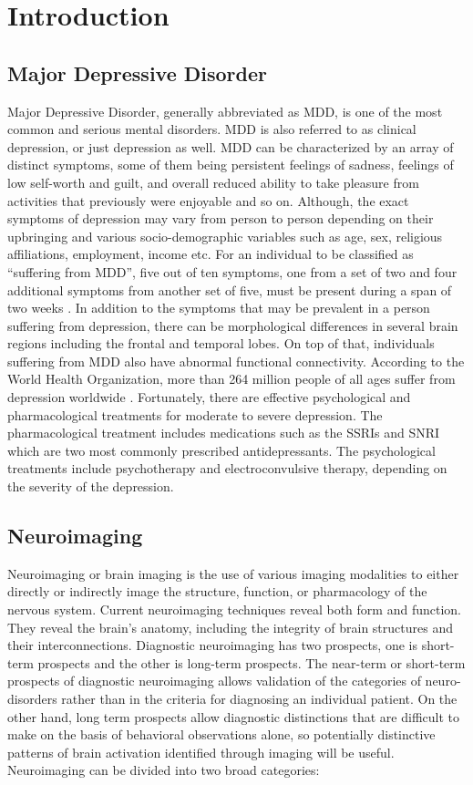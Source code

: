 \documentclass[12pt]{article}
\begin{document}
\section{Introduction}

\subsection{Major Depressive Disorder}

Major Depressive Disorder, generally abbreviated as MDD, is one of the
most common and serious mental disorders. MDD is also referred to as
clinical depression, or just depression as well. MDD can be
characterized by an array of distinct symptoms, some of them being
persistent feelings of sadness, feelings of low self-worth and guilt,
and overall reduced ability to take pleasure from activities that
previously were enjoyable and so on. Although, the exact symptoms of
depression may vary from person to person depending on their
upbringing and various socio-demographic variables such as age, sex,
religious affiliations, employment, income etc. For an individual to
be classified as ``suffering from MDD'', five out of ten symptoms, one
from a set of two and four additional symptoms from another set of
five, must be present during a span of two weeks
\cite{whodepression}. In addition to the symptoms that may be
prevalent in a person suffering from depression, there can be
morphological differences in several brain regions including the
frontal and temporal lobes. On top of that, individuals suffering from
MDD also have abnormal functional connectivity. According to the World
Health Organization, more than 264 million people of all ages suffer
from depression worldwide \cite{whodepression}. Fortunately, there are
effective psychological and pharmacological treatments for moderate to
severe depression. The pharmacological treatment includes medications
such as the SSRIs and SNRI which are two most commonly prescribed
antidepressants. The psychological treatments include psychotherapy
and electroconvulsive therapy, depending on the severity of the
depression.

\subsection{Neuroimaging}

Neuroimaging or brain imaging is the use of various imaging modalities
to either directly or indirectly image the structure, function, or
pharmacology of the nervous system. Current neuroimaging techniques
reveal both form and function. They reveal the brain’s anatomy,
including the integrity of brain structures and their
interconnections. Diagnostic neuroimaging has two prospects, one is
short-term prospects and the other is long-term prospects. The
near-term or short-term prospects of diagnostic neuroimaging allows
validation of the categories of neuro-disorders rather than in the
criteria for diagnosing an individual patient. On the other hand,
long term prospects allow diagnostic distinctions that are difficult
to make on the basis of behavioral observations alone, so potentially
distinctive patterns of brain activation identified through imaging
will be useful. Neuroimaging can be divided into two broad categories:
\end{document}
